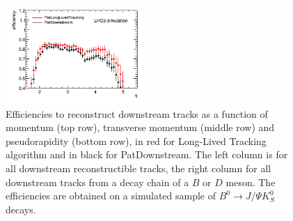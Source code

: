 \begin{figure}[tbph]
\begin{center}
\includegraphics[width = 0.49\textwidth]{figures/EffPatLLT/compare/BJpsiKSFromBDEta.png}
\caption{Efficiencies to reconstruct downstream tracks as a function of momentum (top row), transverse momentum (middle row) and pseudorapidity (bottom row), in red for Long-Lived Tracking algorithm and in black for PatDownstream. The left column is for all downstream reconstructible tracks, the right column for all downstream tracks from a decay chain of a $B$ or $D$ meson. The efficiencies are obtained on a simulated sample of  $B^{0} \rightarrow J/\Psi K^{0}_{S}$ decays.}
\label{fig:EffCompPatLLTBJpsiK}
 \end{center}
 \end{figure}

